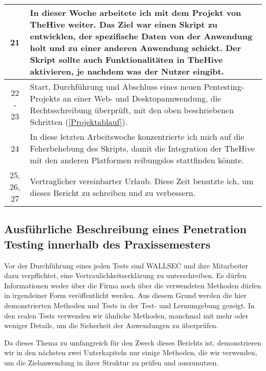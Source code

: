 \begin{table}[H]
\begin{tabularx}{\textwidth}{|c|X|}
    \hline

    21     &  In dieser Woche arbeitete ich mit dem Projekt von \gls{TheHive} weiter. Das Ziel war einen \gls{Skript} zu entwicklen, der spezifische Daten von der Anwendung holt und zu einer anderen Anwendung schickt. Der Skript sollte auch Funktionalitäten in TheHive aktivieren, je nachdem was der Nutzer eingibt. \\

    \hline

    22 - 23  &  Start, Durchführung und Abschluss eines neuen Pentesting-Projekts an einer Web- und Desktopannwendung, die Rechtsschreibung überprüft, mit den oben beschriebenen Schritten (\ref{Projektablauf}). \\

    \hline

    24      &  In diese letzten Arbeitswoche konzentrierte ich mich auf die Feherbehebung des \gls{Skript}s, damit die Integration der \gls{TheHive} mit den anderen Platformen reibungslos stattfinden könnte.  \\

    \hline

    25, 26, 27 &  Vertraglicher vereinbarter Urlaub. Diese Zeit benutzte ich, um dieses Bericht zu schreiben und zu verbessern. \\

    \hline

       \bottomrule
    \end{tabularx}
\end{table}


   
\subsection{Ausführliche Beschreibung eines Penetration Testing innerhalb des Praxissemesters}

Vor der Durchführung eines jeden Tests sind WALLSEC und ihre Mitarbeiter dazu verpflichtet, eine Vertraulichkeitserklärung zu unterschreiben. Es dürfen Informationen weder über die Firma noch über die verwendeten Methoden dürfen in irgendeiner Form veröffentlicht werden. Aus diesem Grund werden die hier demonstrierten Methoden und Tests in der Test- und Lernumgebung  gezeigt. In den realen Tests verwenden wir ähnliche Methoden, manchmal mit mehr oder weniger Details, um die Sicherheit der Anwendungen zu überprüfen. 

Da dieses Thema zu umfangreich für den Zweck dieses Berichts ist, demonstrieren wir in den nächsten zwei Unterkapiteln nur einige Methoden, die wir verwenden, um die Zielanwendung in ihrer Struktur zu prüfen und auszunutzen.

